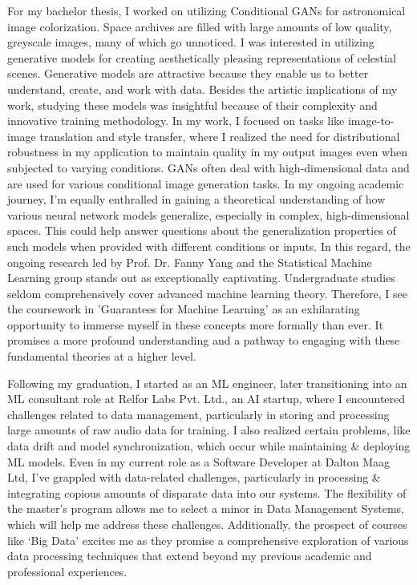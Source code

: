\documentclass{article}
\begin{document}
\hspace{0.25in}For my bachelor thesis, I worked on utilizing Conditional GANs
for astronomical image colorization. Space archives are filled with large
amounts of low quality, greyscale images, many of which go unnoticed. I was
interested in utilizing generative models for creating aesthetically pleasing
representations of celestial scenes. Generative models are attractive because
they enable us to better understand, create, and work with data. Besides the
artistic implications of my work, studying these models was insightful because
of their complexity and innovative training methodology. In my work, I focused
on tasks like image-to-image translation and style transfer, where I realized
the need for distributional robustness in my application to maintain quality in
my output images even when subjected to varying conditions. GANs often deal with
high-dimensional data and are used for various conditional image generation
tasks. In my ongoing academic journey, I’m equally enthralled in gaining a
theoretical understanding of how various neural network models generalize,
especially in complex, high-dimensional spaces. This could help answer questions
about the generalization properties of such models when provided with different
conditions or inputs. In this regard, the ongoing research led by Prof. Dr.
Fanny Yang and the Statistical Machine Learning group stands out as
exceptionally captivating.  Undergraduate studies seldom comprehensively cover
advanced machine learning theory. Therefore, I see the coursework in 'Guarantees
for Machine Learning' as an exhilarating opportunity to immerse myself in these
concepts more formally than ever. It promises a more profound understanding and
a pathway to engaging with these fundamental theories at a higher level.
\vspace{5pt}

\hspace{0.25in}Following my graduation, I started as an ML engineer, later transitioning into
an ML consultant role at Relfor Labs Pvt. Ltd., an AI startup, where I
encountered challenges related to data management, particularly in storing and
processing large amounts of raw audio data for training. I also realized certain
problems, like data drift and model synchronization, which occur while
maintaining \& deploying ML models. Even in my current role as a Software
Developer at Dalton Maag Ltd, I've grappled with data-related challenges,
particularly in processing \& integrating copious amounts of disparate data into
our systems. The flexibility of the master’s program allows me to select a minor
in Data Management Systems, which will help me address these challenges.
Additionally, the prospect of courses like ‘Big Data’ excites me as they promise
a comprehensive exploration of various data processing techniques that extend
beyond my previous academic and professional experiences.
\vspace{5pt}
\end{document}
